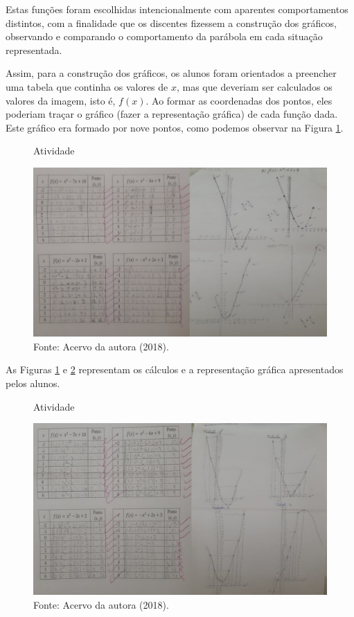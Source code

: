 \begin{refsection}
    Estas funções foram escolhidas intencionalmente com aparentes comportamentos distintos, com a finalidade que os discentes fizessem a construção dos gráficos, observando e comparando o comportamento da parábola em cada situação representada. 

    Assim, para a construção dos gráficos, os alunos foram orientados a preencher uma tabela que continha os valores de $x$, mas que deveriam ser calculados os valores da imagem, isto é, $f(x)$. Ao formar as coordenadas dos pontos, eles poderiam traçar o gráfico (fazer a representação gráfica) de cada função dada. Este gráfico era formado por nove pontos, como podemos observar na Figura \ref{fig:atividade}.
    
    \begin{figure}[ht]%
        \centering%
        \caption{Atividade}%
        \includegraphics[width=.80\textwidth]{articles/03-contribuicoes-do-sof/image8.jpeg}%
        \caption*{Fonte: Acervo da autora (2018).}%
        \label{fig:atividade}%
    \end{figure}%

    As Figuras \ref{fig:atividade} e \ref{fig:atividade-2} representam os cálculos e a representação gráfica apresentados pelos alunos.

    \begin{figure}[ht]%
        \centering%
        \caption{Atividade}%
        \includegraphics[width=.80\textwidth]{articles/03-contribuicoes-do-sof/image9.jpeg}%
        \caption*{Fonte: Acervo da autora (2018).}%
        \label{fig:atividade-2}%
    \end{figure}%


\end{refsection}
